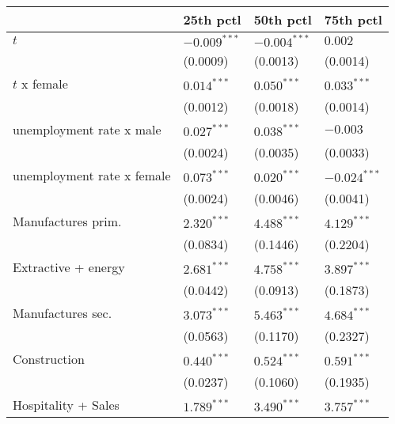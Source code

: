 \begin{tabular}{llll}
\toprule
{} &       25th pctl &       50th pctl &       75th pctl \\
\midrule
$t$                                                &  $-0.009^{***}$ &  $-0.004^{***}$ &         $0.002$ \\
                                                   &        (0.0009) &        (0.0013) &        (0.0014) \\
$t$ x female                                       &   $0.014^{***}$ &   $0.050^{***}$ &   $0.033^{***}$ \\
                                                   &        (0.0012) &        (0.0018) &        (0.0014) \\
unemployment rate x male                           &   $0.027^{***}$ &   $0.038^{***}$ &        $-0.003$ \\
                                                   &        (0.0024) &        (0.0035) &        (0.0033) \\
unemployment rate x female                         &   $0.073^{***}$ &   $0.020^{***}$ &  $-0.024^{***}$ \\
                                                   &        (0.0024) &        (0.0046) &        (0.0041) \\
Manufactures prim.                                 &   $2.320^{***}$ &   $4.488^{***}$ &   $4.129^{***}$ \\
                                                   &        (0.0834) &        (0.1446) &        (0.2204) \\
Extractive + energy                                &   $2.681^{***}$ &   $4.758^{***}$ &   $3.897^{***}$ \\
                                                   &        (0.0442) &        (0.0913) &        (0.1873) \\
Manufactures sec.                                  &   $3.073^{***}$ &   $5.463^{***}$ &   $4.684^{***}$ \\
                                                   &        (0.0563) &        (0.1170) &        (0.2327) \\
Construction                                       &   $0.440^{***}$ &   $0.524^{***}$ &   $0.591^{***}$ \\
                                                   &        (0.0237) &        (0.1060) &        (0.1935) \\
Hospitality + Sales                                &   $1.789^{***}$ &   $3.490^{***}$ &   $3.757^{***}$ \\

\end{tabular}

